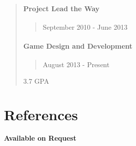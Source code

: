 \documentclass[line,margin]{res}
\begin{document}
\begin{resume}
\begin{quote}
\paragraph{Project Lead the Way}
\begin{quote}
September 2010 - June 2013
\end{quote}
\paragraph{Game Design and
Development}
\begin{quote}
August 2013 - Present
\end{quote}
3.7 GPA
\end{quote}
\section{References}
\paragraph{Available on Request}
\end{resume}
\end{document}
